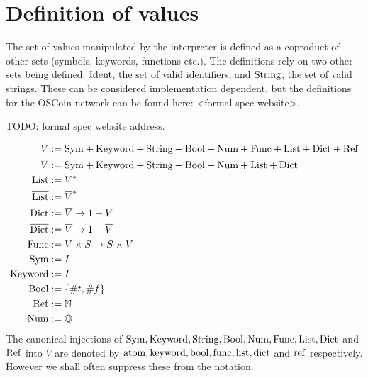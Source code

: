 \section{Definition of \rad values}
\label{value-definition}

The set of values manipulated by the \rad interpreter is defined as a coproduct
of other sets (symbols, keywords, functions etc.). The definitions rely on two
other sets being defined: $\mathrm{Ident}$, the set of valid identifiers, and $\mathrm{String}$,
the set of valid strings. These can be considered implementation dependent, but
the definitions for the OSCoin network can be found here: <formal spec website>.

TODO: formal spec website address.

\begin{align*}
  V &:= \mathrm{Sym} + \mathrm{Keyword} + \mathrm{String} + \mathrm{Bool} + \mathrm{Num} + \mathrm{Func} + \mathrm{List} + \mathrm{Dict} + \mathrm{Ref}\\
  \overline{V} &:= \mathrm{Sym} + \mathrm{Keyword} + \mathrm{String} + \mathrm{Bool} + \mathrm{Num} + \overline{\mathrm{List}} + \overline{\mathrm{Dict}}\\
  \mathrm{List} &:= V^*\\
  \overline{\mathrm{List}} &:= \overline{V}^*\\
  \mathrm{Dict} &:= \overline{V} \to 1 + V\\
  \overline{\mathrm{Dict}} &:= \overline{V} \to 1 + \overline{V}\\
  \mathrm{Func} &:= V \times S \to S \times V\\
  \mathrm{Sym} &:= I\\
  \mathrm{Keyword} &:= I\\
  \mathrm{Bool} &:= \{\#t, \#f\}\\
  \mathrm{Ref} &:= \mathbb{N}\\
  \mathrm{Num} &:= \mathbb{Q}
\end{align*}
The canonical injections of $\mathrm{Sym}, \mathrm{Keyword}, \mathrm{String}, \mathrm{Bool}, \mathrm{Num}, \mathrm{Func}, \mathrm{List},
\mathrm{Dict}$ and $\mathrm{Ref}$ into $V$ are denoted by $\mathrm{atom}, \mathrm{keyword}, \mathrm{bool}, \mathrm{func},
\mathrm{list}, \mathrm{dict}$ and $\mathrm{ref}$ respectively. However we shall often suppress these
from the notation.